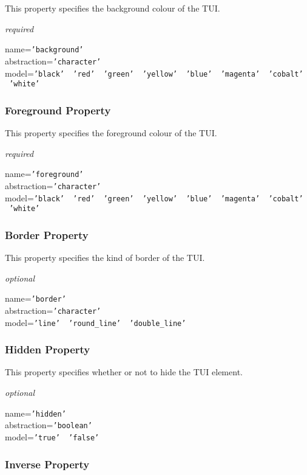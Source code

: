 This property specifies the background colour of the TUI.

\emph{required}

name=\texttt{'background'}\\
abstraction=\texttt{'character'}\\
model=\texttt{'black' \vline\ 'red' \vline\ 'green' \vline\ 'yellow' \vline\ 'blue' \vline\ 'magenta' \vline\ 'cobalt' \vline\ 'white'}

\subsubsection{Foreground Property}

This property specifies the foreground colour of the TUI.

\emph{required}

name=\texttt{'foreground'}\\
abstraction=\texttt{'character'}\\
model=\texttt{'black' \vline\ 'red' \vline\ 'green' \vline\ 'yellow' \vline\ 'blue' \vline\ 'magenta' \vline\ 'cobalt' \vline\ 'white'}

\subsubsection{Border Property}

This property specifies the kind of border of the TUI.

\emph{optional}

name=\texttt{'border'}\\
abstraction=\texttt{'character'}\\
model=\texttt{'line' \vline\ 'round\_line' \vline\ 'double\_line'}

\subsubsection{Hidden Property}

This property specifies whether or not to hide the TUI element.

\emph{optional}

name=\texttt{'hidden'}\\
abstraction=\texttt{'boolean'}\\
model=\texttt{'true' \vline\ 'false'}

\subsubsection{Inverse Property}

